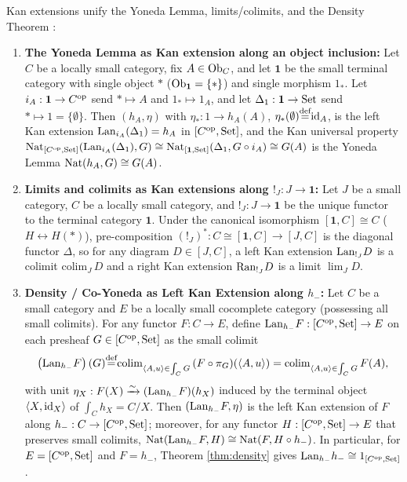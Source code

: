\documentclass[10pt,a4paper]{article}
\begin{document}
\begin{theorem}\label{thm:kan_unification}
Kan extensions unify the Yoneda Lemma, limits/colimits, and the Density Theorem \cite{MacLane1998,Riehl2016}:
\begin{enumerate}
\item \textbf{The Yoneda Lemma as Kan extension along an object inclusion:} Let $C$ be a locally small category, fix $A \in {\textrm{Ob}}_C$, and let $\mathbf{1}$ be the small terminal category with single object $*$ (${\textrm{Ob}}_{\mathbf{1}} = \{*\}$) and single morphism $1_*$. Let $i_A : \mathbf{1} \to C^{\textrm{op}}$ send $* \mapsto A$ and $1_* \mapsto 1_A$, and let $\Delta_1 : \mathbf{1} \to {\textrm{Set}}$ send $* \mapsto 1 = \{\emptyset\}$. Then $(h_A, \eta)$ with $\eta_* : 1 \to h_A(A)$, $\eta_*(\emptyset) {\stackrel{{\textrm{def}}}{=}} {\textrm{id}}_A$, is the left Kan extension ${\mathrm{Lan}}_{i_A}(\Delta_1) = h_A$ in $[C^{\textrm{op}}, {\textrm{Set}}]$, and the Kan universal property ${\textrm{Nat}}_{[C^{\textrm{op}},{\textrm{Set}}]}({\mathrm{Lan}}_{i_A}(\Delta_1), G) \cong {\textrm{Nat}}_{[\mathbf{1},{\textrm{Set}}]}(\Delta_1, G \circ i_A) \cong G(A)$ is the Yoneda Lemma ${\textrm{Nat}}(h_A, G) \cong G(A)$.
\item \textbf{Limits and colimits as Kan extensions along $!_J : J \to \mathbf{1}$:} Let $J$ be a small category, $C$ be a locally small category, and $!_J : J \to \mathbf{1}$ be the unique functor to the terminal category $\mathbf{1}$. Under the canonical isomorphism $[\mathbf{1}, C] \cong C$ ($H \leftrightarrow H(*)$), pre-composition $(!_J)^* : C \cong [\mathbf{1}, C] \to [J, C]$ is the diagonal functor $\Delta$, so for any diagram $D \in [J, C]$, a left Kan extension ${\mathrm{Lan}}_{!_J} D$ is a colimit $\mathrm{colim}_J\, D$ and a right Kan extension ${\mathrm{Ran}}_{!_J} D$ is a limit $\lim_J D$.
\item \textbf{Density / Co-Yoneda as Left Kan Extension along $h_-$:} Let $C$ be a small category and $E$ be a locally small cocomplete category (possessing all small colimits). For any functor $F : C \to E$, define ${\mathrm{Lan}}_{h_-} F : [C^{\textrm{op}}, {\textrm{Set}}] \to E$ on each presheaf $G \in [C^{\textrm{op}}, {\textrm{Set}}]$ as the small colimit
$$\left({\mathrm{Lan}}_{h_-} F\right)(G) {\stackrel{{\textrm{def}}}{=}} \mathrm{colim}_{\langle A, u \rangle \in \int_C G}\, (F \circ \pi_G)(\langle A, u \rangle) = \mathrm{colim}_{\langle A, u \rangle \in \int_C G}\, F(A),$$
with unit $\eta_X : F(X) \xrightarrow{\sim} ({\mathrm{Lan}}_{h_-} F)(h_X)$ induced by the terminal object $\langle X, {\textrm{id}}_X \rangle$ of $\int_C h_X = C / X$. Then $({\mathrm{Lan}}_{h_-} F, \eta)$ is the left Kan extension of $F$ along $h_- : C \to [C^{\textrm{op}}, {\textrm{Set}}]$; moreover, for any functor $H : [C^{\textrm{op}}, {\textrm{Set}}] \to E$ that preserves small colimits, ${\textrm{Nat}}({\mathrm{Lan}}_{h_-} F, H) \cong {\textrm{Nat}}(F, H \circ h_-)$. In particular, for $E = [C^{\textrm{op}}, {\textrm{Set}}]$ and $F = h_-$, Theorem \ref{thm:density} gives ${\mathrm{Lan}}_{h_-} h_- \cong 1_{[C^{\textrm{op}}, {\textrm{Set}}]}$.
\end{enumerate}
\end{theorem}
\end{document}
